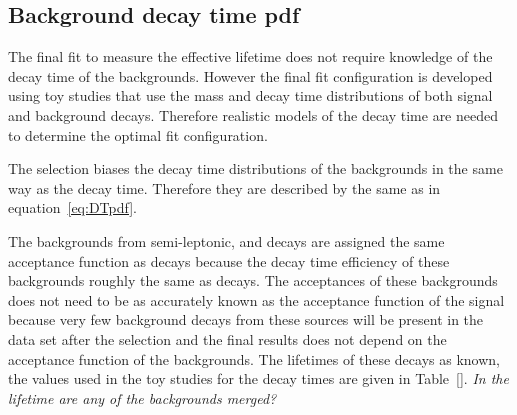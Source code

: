 {\subsection{Background decay time pdf}
\label{sec:bkgDTpdf}

The final fit to measure the \bsmumu effective lifetime does not require knowledge of the decay time \pdfs of the backgrounds. However the final fit configuration is developed using toy studies that use the mass and decay time distributions of both signal and background decays. Therefore realistic models of the decay time \pdfs are needed to determine the optimal fit configuration. 


The selection biases the decay time distributions of the backgrounds in the same way as the \bsmumu decay time. Therefore they are described by the same \pdfs as in equation~\ref{eq:DTpdf}. 

The backgrounds from semi-leptonic, \bhh and \bdmumu decays are assigned the same acceptance function as \bsmumu decays because the decay time efficiency of these backgrounds roughly the same as \bsmumu decays. The acceptances of these backgrounds does not need to be as accurately known as the acceptance function of the signal because very few background decays from these sources will be present in the data set after the selection and the final results does not depend on the acceptance function of the backgrounds. The lifetimes of these decays as known, the values used in the toy studies for the decay times \pdfs are given in Table~\ref{}. {\it In the lifetime are any of the backgrounds merged?}

}
